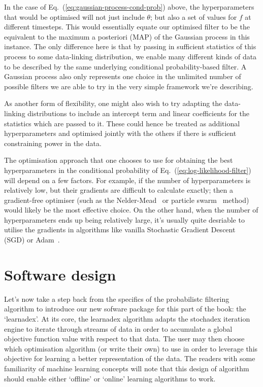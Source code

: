 In the case of Eq.~(\ref{eq:gaussian-process-cond-prob}) above, the hyperparameters that would be optimised will not just include $\theta$; but also a set of values for $f$ at different timesteps. This would essentially equate our optimised filter to be the equivalent to the maximum a posteriori (MAP) of the Gaussian process in this instance. The only difference here is that by passing in sufficient statistics of this process to some data-linking distribution, we enable many different kinds of data to be described by the same underlying conditional probability-based filter. A Gaussian process also only represents one choice in the unlimited number of possible filters we are able to try in the very simple framework we're describing. 

As another form of flexibility, one might also wish to try adapting the data-linking distributions to include an intercept term and linear coefficients for the statistics which are passed to it. These could hence be treated as additional hyperparameters and optimised jointly with the others if there is sufficient constraining power in the data.

The optimisation approach that one chooses to use for obtaining the best hyperparameters in the conditional probability of Eq.~(\ref{eq:log-likelihood-filter}) will depend on a few factors. For example, if the number of hyperparameters is relatively low, but their gradients are difficult to calculate exactly; then a gradient-free optimiser (such as the Nelder-Mead~\cite{nelder1965simplex} or particle swarm~\cite{kennedy1995particle, shi1998modified} method) would likely be the most effective choice. On the other hand, when the number of hyperparameters ends up being relatively large, it's usually quite desriable to utilise the gradients in algorithms like vanilla Stochastic Gradient Descent~\cite{robbins1951stochastic} (SGD) or Adam~\cite{kingma2014adam}.

\section{\sffamily Software design}

Let's now take a step back from the specifics of the probabilistc filtering algorithm to introduce our new sofware package for this part of the book: the `learnadex'. At its core, the learnadex algorithm adapts the stochadex iteration engine to iterate through streams of data in order to accumulate a global objective function value with respect to that data. The user may then choose which optimisation algorithm (or write their own) to use in order to leverage this objective for learning a better representation of the data. The readers with some familiarity of machine learning concepts will note that this design of algorithm should enable either `offline' or `online' learning algorithms to work.

